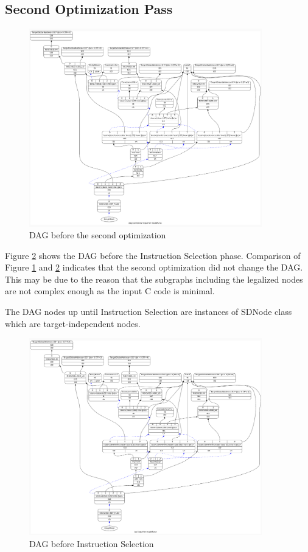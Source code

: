 \subsection{Second Optimization Pass}
\begin{figure}
    \centering
    \includegraphics[width=0.9\textwidth]{path_instruction/madd_dag_combine2.png}
    \caption{DAG before the second optimization}
    \label{fig:combine2}
\end{figure}

Figure \ref{fig:isel} shows the DAG before the Instruction Selection phase. Comparison of Figure \ref{fig:combine2} and \ref{fig:isel} indicates that the second optimization did not change the DAG. This may be due to the reason that the subgraphs including the legalized nodes are not complex enough as the input C code is minimal.
\par
The DAG nodes up until Instruction Selection are instances of SDNode class which are target-independent nodes.
\begin{figure}
    \centering
    \includegraphics[width=0.9\textwidth]{path_instruction/madd_dag_isel.png}
    \caption{DAG before Instruction Selection}
    \label{fig:isel}
\end{figure}

